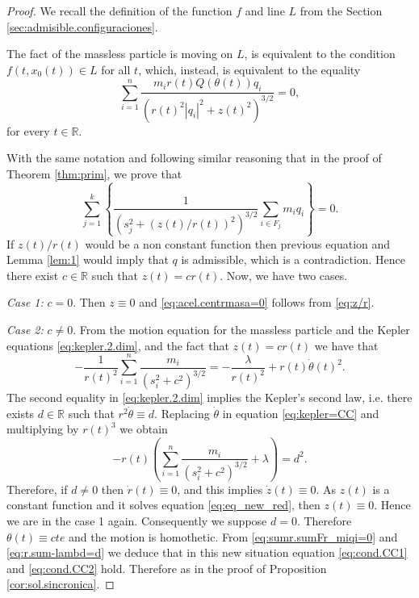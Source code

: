 \documentclass[twoside]{article}
\theoremstyle{remark}
\newcommand{\rr}{\mathbb{R}}
\begin{document}
\begin{proof}
 We recall the definition of the function $f$ and line $L$ from the Section \ref{sec:admisible.configuraciones}.

The fact of the massless particle is moving on $L$, is equivalent to the condition $f(t,x_0(t))\in L$ for all $t$, which, instead, is equivalent to the equality
\begin{equation}\label{eq:z/r}
 \sum_{i=1}^n\frac{m_ir(t)Q(\theta (t))q_i}{\left(r(t)^2|q_i|^2+z(t)^2\right)^{3/2}}=0,
\end{equation}
for every $t\in \rr$.

With the same notation and following similar reasoning that in the proof of Theorem \ref{thm:prim}, we prove that
\begin{equation}\label{eq:sumr.sumFr_miqi=0}
\sum_{j=1}^k\left\{\frac{1}{(s_j^{2}+(z(t)/r(t))^2)^{3/2}}\sum_{i\in F_j}m_iq_i\right\}=0.
\end{equation}
If $z(t)/r(t)$  would be a non constant function then previous equation and Lemma \ref{lem:1} would imply that $q$ is admissible, which is a contradiction. Hence there exist $c\in \rr$ such that $z(t)=cr(t)$. Now, we have two cases.

\emph{Case 1:} $c=0$. Then $z\equiv 0$ and \eqref{eq:acel.centrmasa=0} follows from \eqref{eq:z/r}.

\emph{Case 2:} $c\neq 0$. From the motion equation for the massless particle and the Kepler equations \eqref{eq:kepler.2.dim}, and the fact that $z(t)=cr(t)$ we have that
\begin{equation}\label{eq:kepler=CC}
 -\frac{1}{r(t)^2}\sum_{i=1}^{n}\frac{m_i}{(s_i^2+c^2)^{3/2}}=-\frac{\lambda}{r(t)^2}+r(t)\dot{\theta}(t)^2.
\end{equation}
The second equality in \eqref{eq:kepler.2.dim} implies the Kepler's second law, i.e. there exists $d\in\rr$ such that $r^2\dot{\theta}\equiv d$. Replacing $\dot{\theta}$ in equation \eqref{eq:kepler=CC} and multiplying by $r(t)^3$ we obtain
\begin{equation}\label{eq:r.sum-lambd=d}
-r(t)\left(\sum_{i=1}^{n}\frac{m_i}{(s_i^2+c^2)^{3/2}}+\lambda\right)=d^2.
\end{equation}
Therefore, if $d\neq 0$ then $\dot{r}(t)\equiv 0$, and this implies $\dot{z}(t)\equiv 0$. As $z(t)$ is a constant function and it solves equation \eqref{eq:eq_new_red}, then $z(t)\equiv 0$. Hence we are in the case 1 again. Consequently we suppose $d=0$. Therefore $\theta(t)\equiv cte$ and the motion is homothetic. From \eqref{eq:sumr.sumFr_miqi=0} and \eqref{eq:r.sum-lambd=d} we deduce that in this new situation equation \eqref{eq:cond.CC1} and \eqref{eq:cond.CC2} hold. Therefore as in the proof of Proposition \ref{cor:sol.sincronica}.
\end{proof}
\end{document}

